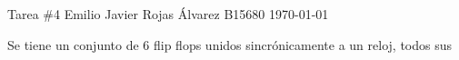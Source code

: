 \documentclass{article}
\begin{document}

\portada
{Tarea \#4}
{Emilio Javier Rojas Álvarez}
{B15680}
{\today}

Se tiene un conjunto de 6 flip flops unidos sincrónicamente a un reloj, todos
sus





\end{document}
